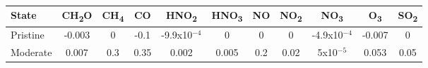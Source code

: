 \begin{table}[H]
    \centering
    \begin{tabular}{lcccccccccc}\hline
        State    & CH\textsubscript{2}O & CH\textsubscript{4} & CO   & HNO\textsubscript{2} & HNO\textsubscript{3} & NO  & NO\textsubscript{2} & NO\textsubscript{3} & O\textsubscript{3} & SO\textsubscript{2} \\\hline
        Pristine & -0.003               & 0                   & -0.1 & -9.9x10$^{-4}$       & 0                    & 0   & 0                   & -4.9x10$^{-4}$      & -0.007             & 0                   \\
        Moderate & 0.007                & 0.3                 & 0.35 & 0.002                & 0.005                & 0.2 & 0.02                & 5x10$^{-5}$         & 0.053              & 0.05                \\\hline
    \end{tabular}
    \caption{}
    \label{table:states}
\end{table}